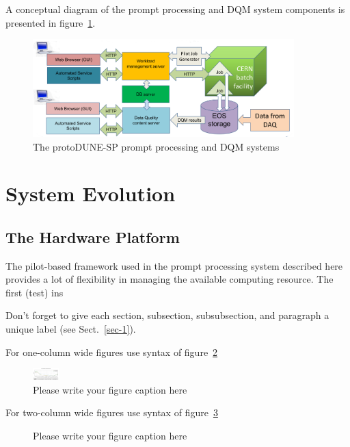 \documentclass{webofc}
\begin{document}
\noindent
A conceptual diagram of the prompt processing and DQM system components
is presented in figure~\ref{dqm-diagram}.

\begin{figure}[h]
\centering
\includegraphics[width=0.9\textwidth,clip]{figures/dqm-p3s-diagram.png}
\caption{The protoDUNE-SP prompt processing and DQM systems}
\label{dqm-diagram}
\end{figure}

\section{System Evolution}

\subsection{The Hardware Platform}
\label{sec:hardware}

The pilot-based framework used in the prompt processing system described here
provides a lot of flexibility in managing the available computing resource. The first (test)
ins



Don't forget to give each section, subsection, subsubsection, and
paragraph a unique label (see Sect.~\ref{sec-1}).

For one-column wide figures use syntax of figure~\ref{fig-1}
\begin{figure}[h]
\centering
\includegraphics[width=1cm,clip]{figures/dqm_purmon_20190910_1.png}
\caption{Please write your figure caption here}
\label{fig-1}       %
\end{figure}

For two-column wide figures use syntax of figure~\ref{fig-2}
\begin{figure}
\centering
\vspace*{5cm}       %
\caption{Please write your figure caption here}
\label{fig-2}       %
\end{figure}
\end{document}
